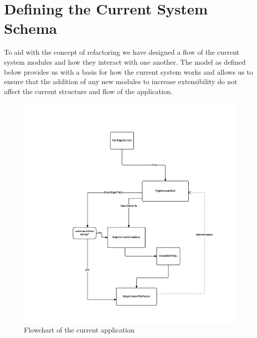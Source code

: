 \documentclass{article}
\begin{document}
\section{Defining the Current System Schema}
To aid with the concept of refactoring we have designed a flow of the current system modules and how they interact with one another. The model as defined below provides us with a basis for how the current system works and allows us to ensure that the addition of any new modules to increase extensibility do not affect the current structure and flow of the application.

\begin{figure}[h]\raggedleft
\caption{Flowchart of the current application}
\includegraphics[scale=0.75]{InitialApplicationFlow}
\end{figure}
\end{document}
